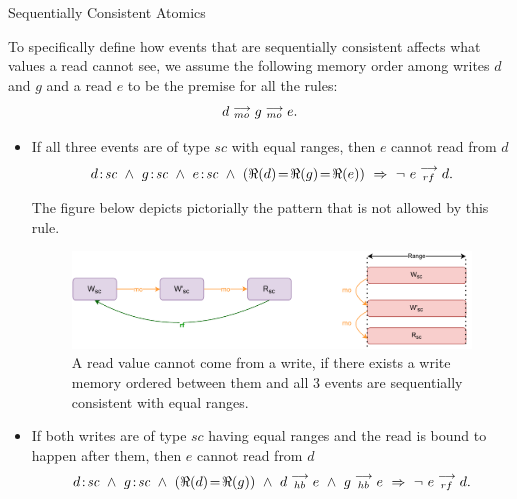         \begin{axiom}{Sequentially Consistent Atomics}
            \label{SeqCsAt}   
            
            To specifically define how events that are sequentially consistent affects what values a read cannot see, we assume the following memory order among writes $d$ and $g$ and a read $e$ to be the premise for all the rules:  
                \begin{align*}
                    d \stackrel{\longrightarrow}{_{mo}} g \stackrel{\longrightarrow}{_{mo}} e.
                \end{align*}
               
            \begin{itemize}
                \item If all three events are of type $sc$ with equal ranges, then $e$ cannot read from $d$
                    \begin{align*}
                        \et{d}{sc}\ \wedge\ \et{g}{sc}\ \wedge\ \et{e}{sc} 
                        \ \wedge \ (\Re(d) \!=\! \Re(g) \!=\! \Re(e))
                        \ \Rightarrow{} \ 
                        \neg \ \reln{e}{rf}{d}.
                    \end{align*} 
                        
                    The figure below depicts pictorially the pattern that is not allowed by this rule.
                    \begin{figure}[H]
                        \centering 
                        \includegraphics[scale=0.7]{ECMAScriptMemoryModel/SequentialAtomics1.pdf}
                        \caption{A read value cannot come from a write, if there exists a write memory ordered between them and all  3 events are sequentially consistent with equal ranges.}
                    \end{figure}
                    
                \item If both writes are of type $sc$ having equal ranges and the read is bound to happen after them, then $e$ cannot read from $d$ 
                    \begin{align*}
                        d\!:\!\textit{sc}\ \wedge\ g\!:\!\textit{sc}  
                        \ \wedge \ (\Re(d) \!=\! \Re(g)) 
                        \ \wedge \ d\stackrel{\longrightarrow}{_{hb}}e
                        \ \wedge \ g\stackrel{\longrightarrow}{_{hb}}e
                        \ \Rightarrow{}\  
                        \neg \ e\stackrel{\longrightarrow}{_{rf}}d.
                    \end{align*}
                        

\end{itemize}
\end{axiom}
